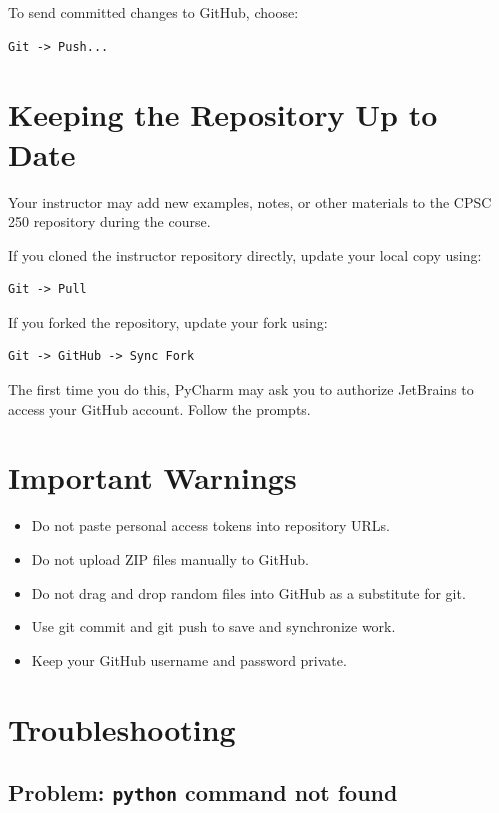 \documentclass[11pt]{article}
\begin{document}
To send committed changes to GitHub, choose:

\begin{lstlisting}[style=terminal]
Git -> Push...
\end{lstlisting}

\section{Keeping the Repository Up to Date}

Your instructor may add new examples, notes, or other materials to the CPSC 250 repository during the course.

If you cloned the instructor repository directly, update your local copy using:

\begin{lstlisting}[style=terminal]
Git -> Pull
\end{lstlisting}

If you forked the repository, update your fork using:

\begin{lstlisting}[style=terminal]
Git -> GitHub -> Sync Fork
\end{lstlisting}

The first time you do this, PyCharm may ask you to authorize JetBrains to access your GitHub account. Follow the prompts.

\section{Important Warnings}

\begin{itemize}
    \item Do not paste personal access tokens into repository URLs.
    \item Do not upload ZIP files manually to GitHub.
    \item Do not drag and drop random files into GitHub as a substitute for git.
    \item Use git commit and git push to save and synchronize work.
    \item Keep your GitHub username and password private.
\end{itemize}

\section{Troubleshooting}

\subsection*{Problem: \texttt{python} command not found}
\end{document}
